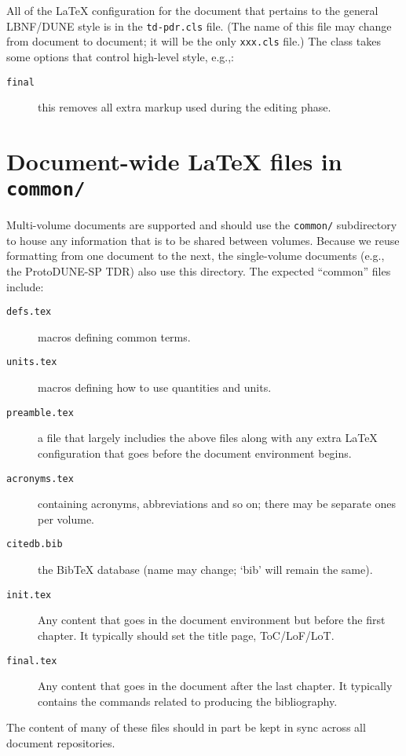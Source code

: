 All of the \LaTeX{} configuration for the document that pertains to
the general LBNF/DUNE style is in the
\texttt{td-pdr.cls} file. (The name of this file may change from document to document; it will be the only \texttt{xxx.cls} file.)
The class takes some options that control high-level style, e.g.,:

\begin{description}
\item[\texttt{final}] this removes all extra markup used during the
  editing phase.
\end{description}


\section{Document-wide \LaTeX{} files in \texttt{common/}}
\label{sec:tech-common}

Multi-volume documents are supported and should use the
\texttt{common/} subdirectory to house any information that is to be
shared between volumes.
Because we reuse formatting from one document to the next, the single-volume documents (e.g., the ProtoDUNE-SP TDR) also use this directory.
The expected ``common'' files include:
\begin{description}
\item[\texttt{defs.tex}] macros defining common terms.
\item[\texttt{units.tex}] macros defining how to use quantities and units.
\item[\texttt{preamble.tex}] a file that largely includies the above files along with
  any extra \LaTeX{} configuration that goes before the document
  environment begins.
\item[\texttt{acronyms.tex}] containing acronyms, abbreviations and so on; there may be separate ones per volume.
\item[\texttt{citedb.bib}] the BibTeX database (name may change; `bib' will remain the same).
\item[\texttt{init.tex}] Any content that goes in the document
  environment but before the first chapter.
  It typically should set the title page, ToC/LoF/LoT.
\item[\texttt{final.tex}] Any content that goes in the document after
  the last chapter.
  It typically contains the commands related to producing the
  bibliography.
\end{description}

The content of many of these files should in part be kept in sync
across all document repositories.

